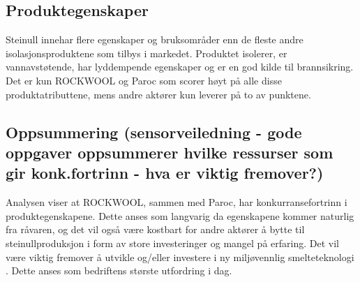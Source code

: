 \subsection{Produktegenskaper}
Steinull innehar flere egenskaper og bruksområder enn de fleste andre isolasjonsproduktene som tilbys i markedet. Produktet isolerer, er vannavstøtende, har lyddempende egenskaper og er en god kilde til brannsikring. Det er kun ROCKWOOL og Paroc som scorer høyt på alle disse produktatributtene, mens andre aktører kun leverer på to av punktene.  

\subsection{Oppsummering (sensorveiledning - gode oppgaver oppsummerer hvilke ressurser som gir konk.fortrinn - hva er viktig fremover?)}
Analysen viser at ROCKWOOL, sammen med Paroc, har konkurransefortrinn i produktegenskapene. Dette anses som langvarig da egenskapene kommer naturlig fra råvaren, og det vil også være kostbart for andre aktører å bytte til steinullproduksjon i form av store investeringer og mangel på erfaring. Det vil være viktig fremover å utvikle og/eller investere i ny miljøvennlig smelteteknologi . Dette anses som bedriftens største utfordring i dag.